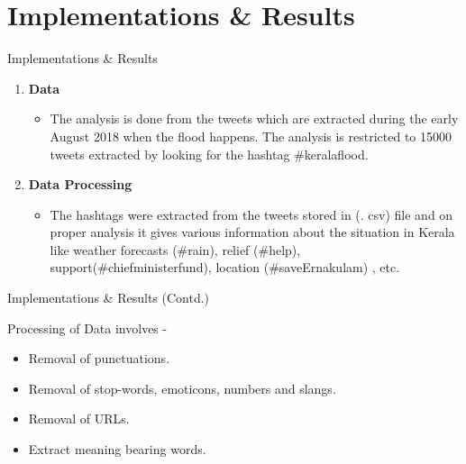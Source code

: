\documentclass[10pt]{beamer}
\begin{document}
\section{Implementations  \& Results}
\begin{frame}[fragile]{ Implementations  \& Results}
\begin{enumerate}
    \item \textbf{Data}

 \begin{itemize}
     \item The analysis is done from the tweets which are extracted
during the early August 2018 when the flood happens. The
analysis is restricted to 15000 tweets extracted by looking
for the hashtag \#keralaflood.
 \end{itemize}
\item \textbf{Data Processing}
 \begin{itemize}
     \item The hashtags were extracted from the tweets stored in (.
csv) file and on proper analysis it gives various information
about the situation in Kerala like weather forecasts (\#rain), 
relief (\#help), support(\#chiefministerfund), location
(\#saveErnakulam) , etc.

 \end{itemize}
 \end{enumerate}
\end{frame}
\begin{frame}[fragile]{ Implementations  \& Results (Contd.) }

Processing of Data involves -
 \begin{itemize}
\item  Removal of punctuations.
\item Removal of stop-words, emoticons, numbers and
slangs.
\item Removal of URLs.
\item Extract meaning bearing words.
 \end{itemize}
\end{frame}
\end{document}
